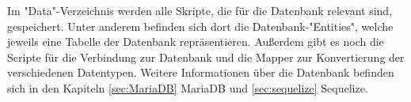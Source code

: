 
Im "Data"-Verzeichnis werden alle Skripte, die für die Datenbank relevant sind, gespeichert.
Unter anderem befinden sich dort die Datenbank-"Entities", welche jeweils eine Tabelle der Datenbank repräsentieren.
Außerdem gibt es noch die Scripte für die Verbindung zur Datenbank und die Mapper zur Konvertierung der verschiedenen Datentypen. 
Weitere Informationen über die Datenbank befinden sich in den Kapiteln \ref{sec:MariaDB} MariaDB und \ref{sec:sequelize} Sequelize.